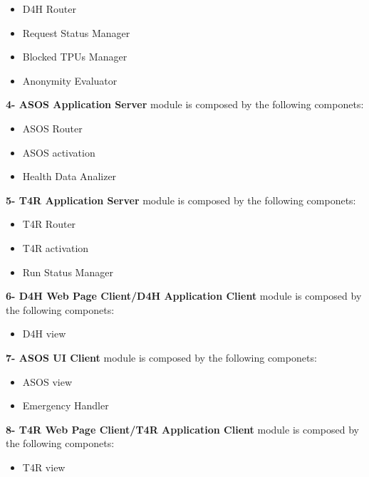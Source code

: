 \begin{itemize}
\item D4H Router
\item Request Status Manager
\item Blocked TPUs Manager
\item Anonymity Evaluator
\end{itemize}
\textbf{4- ASOS Application Server} module is composed by the following componets:
\begin{itemize}
\item ASOS Router
\item ASOS activation
\item Health Data Analizer
\end{itemize}
\textbf{5- T4R Application Server} module is composed by the following componets:
\begin{itemize}
\item T4R Router
\item T4R activation
\item Run Status Manager
\end{itemize}
\textbf{6- D4H Web Page Client/D4H Application Client} module is composed by the following componets:
\begin{itemize}
\item D4H view
\end{itemize}
\textbf{7- ASOS UI Client} module is composed by the following componets:
\begin{itemize}
\item ASOS view
\item Emergency Handler
\end{itemize}
\textbf{8- T4R Web Page Client/T4R Application Client} module is composed by the following componets:
\begin{itemize}
\item T4R view
\end{itemize}
